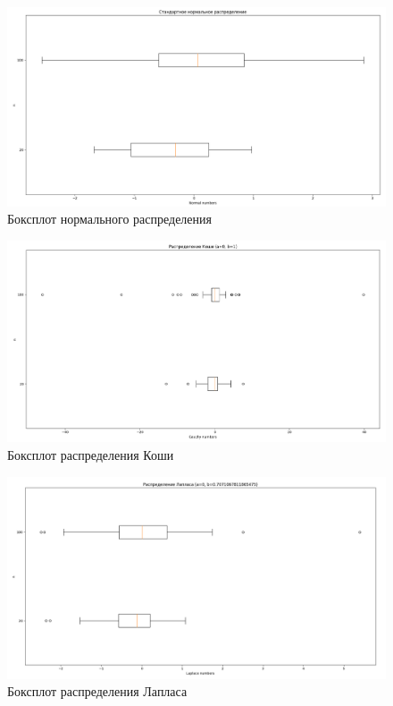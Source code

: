 \begin{figure}[H]
	\centering
	\includegraphics[scale=0.3]{resources/3_gauss.png}
	\caption{Боксплот нормального распределения}
\end{figure}

\begin{figure}[H]
	\centering
	\includegraphics[scale=0.3]{resources/3_cauchy.png}
	\caption{Боксплот распределения Коши}
\end{figure}

\begin{figure}[H]
	\centering
	\includegraphics[scale=0.3]{resources/3_laplace.png}
	\caption{Боксплот распределения Лапласа}
\end{figure}

